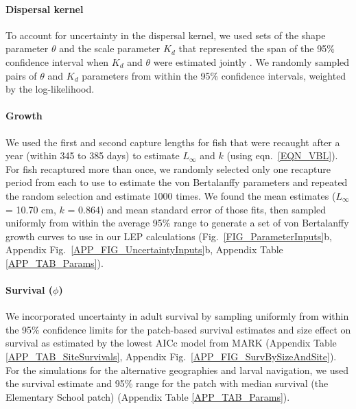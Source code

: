\documentclass[12pt, oneside]{article}   	%
\begin{document}
\paragraph*{Dispersal kernel} %

To account for uncertainty in the dispersal kernel, we used sets of the shape parameter $\theta$ and the scale parameter $K_d$ that represented the span of the 95\% confidence interval when $K_d$ and $\theta$ were estimated jointly \citep[Appendix Table \ref{APP_TAB_Params}, Fig.\ \ref{FIG_ParameterInputs}a,][]{catalanoInPrepconnectivity}. We randomly sampled pairs of $\theta$ and $K_d$ parameters from within the 95\% confidence intervals, weighted by the log-likelihood. %

\paragraph*{Growth} %

We used the first and second capture lengths for fish that were recaught after a year (within 345 to 385 days) to estimate $L_\infty$ and $k$ (using eqn.\ \ref{EQN_VBL}). For fish recaptured more than once, we randomly selected only one recapture period from each to use to estimate the von Bertalanffy parameters and repeated the random selection and estimate 1000 times. We found the mean estimates ($L_\infty$ = 10.70 cm, $k$ = 0.864) and mean standard error of those fits, then sampled uniformly from within the average 95\% range to generate a set of von Bertalanffy growth curves to use in our LEP calculations (Fig.\ \ref{FIG_ParameterInputs}b, Appendix Fig.\ \ref{APP_FIG_UncertaintyInputs}b, Appendix Table \ref{APP_TAB_Params}).

\paragraph*{Survival ($\phi$)} %

We incorporated uncertainty in adult survival by sampling uniformly from within the 95\% confidence limits for the patch-based survival estimates and size effect on survival as estimated by the lowest AICc model from MARK (Appendix Table \ref{APP_TAB_SiteSurvivals}, Appendix Fig.\ \ref{APP_FIG_SurvBySizeAndSite}). For the simulations for the alternative geographies and larval navigation, we used the survival estimate and 95\% range for the patch with median survival (the Elementary School patch) (Appendix Table \ref{APP_TAB_Params}). 
\end{document}
